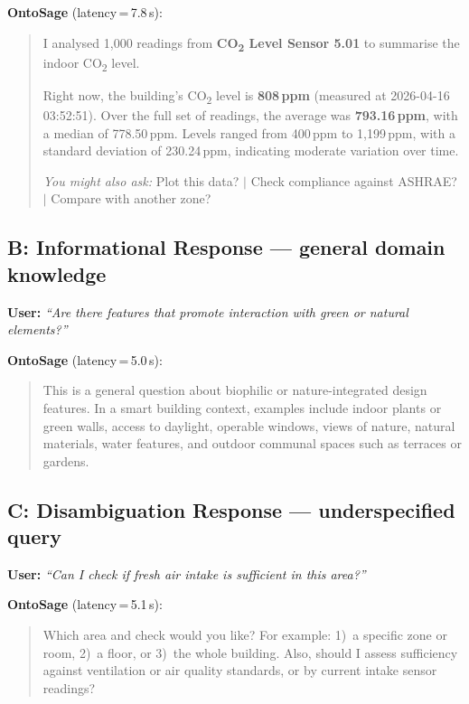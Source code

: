 \documentclass[acmsmall]{acmart}
\begin{document}
\noindent\textbf{OntoSage} (latency\,=\,7.8\,s):
\begin{quote}\small
I analysed 1,000 readings from \textbf{CO\textsubscript{2} Level Sensor 5.01} to summarise the indoor CO\textsubscript{2} level.

Right now, the building's CO\textsubscript{2} level is \textbf{808\,ppm} (measured at 2026-04-16 03:52:51). Over the full set of readings, the average was \textbf{793.16\,ppm}, with a median of 778.50\,ppm. Levels ranged from 400\,ppm to 1,199\,ppm, with a standard deviation of 230.24\,ppm, indicating moderate variation over time.

\textit{You might also ask:} Plot this data? $\mid$ Check compliance against ASHRAE? $\mid$ Compare with another zone?
\end{quote}

\subsection*{B: Informational Response --- general domain knowledge}

\noindent\textbf{User:} \emph{``Are there features that promote interaction with green or natural elements?''}

\noindent\textbf{OntoSage} (latency\,=\,5.0\,s):
\begin{quote}\small
This is a general question about biophilic or nature-integrated design features. In a smart building context, examples include indoor plants or green walls, access to daylight, operable windows, views of nature, natural materials, water features, and outdoor communal spaces such as terraces or gardens.
\end{quote}

\subsection*{C: Disambiguation Response --- underspecified query}

\noindent\textbf{User:} \emph{``Can I check if fresh air intake is sufficient in this area?''}

\noindent\textbf{OntoSage} (latency\,=\,5.1\,s):
\begin{quote}\small
Which area and check would you like? For example: 1)~a specific zone or room, 2)~a floor, or 3)~the whole building. Also, should I assess sufficiency against ventilation or air quality standards, or by current intake sensor readings?
\end{quote}
\end{document}
